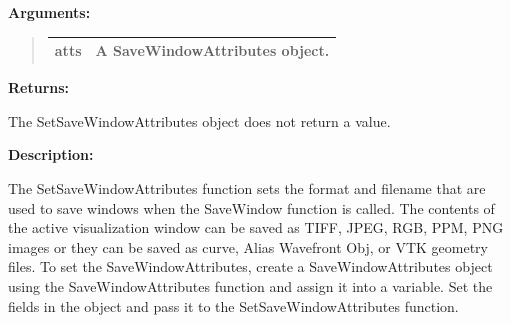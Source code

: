 \documentclass[letterpaper,10pt,english]{sphinxmanual}
\begin{document}
\begin{DUlineblock}{0em}
\item[] 
\item[] \textbf{Arguments:}
\end{DUlineblock}
\begin{quote}

\begin{tabulary}{\linewidth}{|L|L|}
\hline

atts
 & 
A SaveWindowAttributes object.
\\
\hline\end{tabulary}

\end{quote}

\begin{DUlineblock}{0em}
\item[] 
\item[] \textbf{Returns:}
\item[] The SetSaveWindowAttributes object does not return a value.
\item[] 
\item[] \textbf{Description:}
\item[] The SetSaveWindowAttributes function sets the format and filename that are
used to save windows when the SaveWindow function is called. The contents
of the active visualization window can be saved as TIFF, JPEG, RGB, PPM,
PNG images or they can be saved as curve, Alias Wavefront Obj, or VTK
geometry files. To set the SaveWindowAttributes, create a
SaveWindowAttributes object using the SaveWindowAttributes function and
assign it into a variable. Set the fields in the object and pass it to the
SetSaveWindowAttributes function.
\end{DUlineblock}

\begin{DUlineblock}{0em}
\item[] 
\end{DUlineblock}
\end{document}
